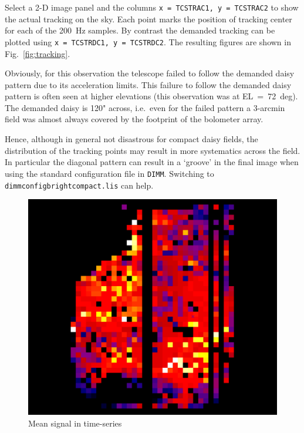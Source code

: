 \documentclass[twoside,11pt]{article}
\renewcommand{\_}{\texttt{\symbol{95}}}
\begin{document}
Select a 2-D image panel and the columns \texttt{x = TCS\_TR\_AC1, y =
TCS\_TR\_AC2} to show the actual tracking on the sky.  Each point
marks the position of tracking center for each of the 200~Hz samples.
By contrast the demanded tracking can be plotted using
\texttt{x~=~TCS\_TR\_DC1, y~=~TCS\_TR\_DC2}. The resulting figures are
shown in Fig.~\ref{fig:tracking}.

Obviously, for this observation the telescope failed to follow the
demanded daisy pattern due to its acceleration limits. This failure to
follow the demanded daisy pattern is often seen at higher elevations
(this observation was at EL~=~72~deg). The demanded daisy is 120"
across, i.e.\ even for the failed pattern a 3-arcmin field was almost
always covered by the footprint of the bolometer array.

Hence, although in general not disastrous for compact daisy fields,
the distribution of the tracking points may result in more systematics
across the field. In particular the diagonal pattern can result in a
`groove' in the final image when using the standard configuration file
in \texttt{DIMM}. Switching to \texttt{dimmconfig\_bright\_compact.lis}
can help.

\begin{figure}
\begin{center}
\includegraphics[width=0.45\linewidth]{sc19_con_collapse}
\caption{ Mean signal in time-series }
\label{fig:concollapse}
\end{center}
\end{figure}
\end{document}
